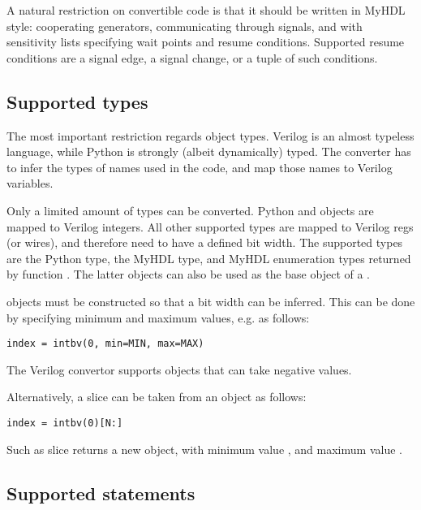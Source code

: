 A natural restriction on convertible code is that it should be
written in MyHDL style: cooperating generators, communicating through
signals, and with sensitivity lists specifying wait points and resume
conditions.  Supported resume conditions are a signal edge, a signal
change, or a tuple of such conditions.

\subsection{Supported types\label{conv-subset-types}}

The most important restriction regards object types. Verilog is an
almost typeless language, while Python is strongly (albeit
dynamically) typed. The converter has to infer the types of names
used in the code, and map those names to Verilog variables.

Only a limited amount of types can be converted.
Python  and  objects are mapped to Verilog
integers. All other supported types are mapped to Verilog regs (or
wires), and therefore need to have a defined bit width. The supported
types are the Python  type, the MyHDL  type,
and MyHDL enumeration types returned by function . The
latter objects can also be used as the base object of a
. 

 objects must be constructed so that a bit
width can be inferred. This can be done by specifying minimum
and maximum values, e.g. as follows:

\begin{verbatim}
index = intbv(0, min=MIN, max=MAX)
\end{verbatim}

The Verilog convertor supports  objects that
can take negative values.

Alternatively, a slice can be taken from an  object
as follows:

\begin{verbatim}
index = intbv(0)[N:]
\end{verbatim}

Such as slice returns a new  object, with minimum
value  , and maximum value .


\subsection{Supported statements\label{conv-subset-statements}}

